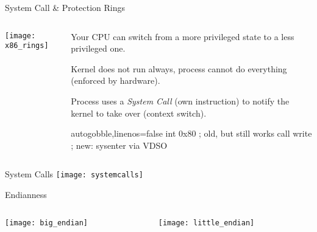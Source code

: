 \documentclass[beamer]{uibk}
\begin{document}
\begin{frame}[fragile]{System Call \& Protection Rings}
    \begin{columns}
        \begin{column}{0.55\textwidth}
            \texttt{[image: x86\_rings]}
        \end{column}
        \begin{column}{0.45\textwidth}
            Your CPU can switch from a more privileged state to a less
            privileged one.

            \bigskip

            Kernel does not run always, process cannot do everything (enforced
            by hardware).

            \bigskip

            Process uses a \emph{System Call} (own instruction) to notify the
            kernel to take over (context switch).

            \begin{nasmcode*}{autogobble,linenos=false}
                int   0x80   ; old, but still works
                call  write  ; new: sysenter via VDSO
            \end{nasmcode*}
        \end{column}
    \end{columns}
\end{frame}

\begin{frame}{System Calls}
    \texttt{[image: systemcalls]}
\end{frame}

\begin{frame}{Endianness}
    \begin{columns}
        \begin{column}{0.5\textwidth}
            \begin{center}
                \texttt{[image: big\_endian]}
            \end{center}
        \end{column}
        \begin{column}{0.5\textwidth}
            \begin{center}
                \texttt{[image: little\_endian]}
            \end{center}
        \end{column}
    \end{columns}
\end{frame}
\end{document}
